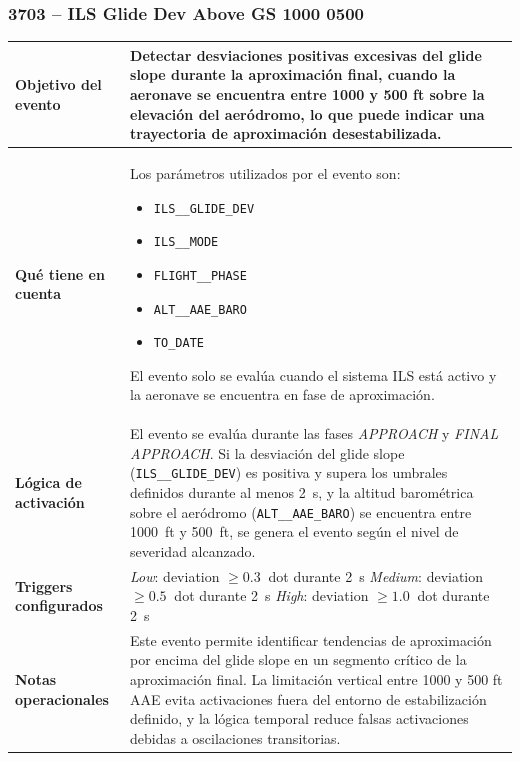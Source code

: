 \documentclass[11pt,a4paper]{article}
\begin{document}
	\subsubsection{3703 -- ILS Glide Dev Above GS 1000 0500}
	
	\begin{longtable}{p{5cm} p{9.5cm}}
		\hline
		\textbf{Objetivo del evento} &
		Detectar desviaciones positivas excesivas del glide slope durante la aproximación final, cuando la aeronave se encuentra entre 1000 y 500 ft sobre la elevación del aeródromo, lo que puede indicar una trayectoria de aproximación desestabilizada. \\
		\hline
		
		\textbf{Qué tiene en cuenta} &
		Los parámetros utilizados por el evento son:
		\begin{itemize}
			\item \texttt{ILS\_\_GLIDE\_DEV}
			\item \texttt{ILS\_\_MODE}
			\item \texttt{FLIGHT\_\_PHASE}
			\item \texttt{ALT\_\_AAE\_BARO}
			\item \texttt{TO\_DATE}
		\end{itemize}
		El evento solo se evalúa cuando el sistema ILS está activo y la aeronave se encuentra en fase de aproximación. \\
		\hline
		
		\textbf{Lógica de activación} &
		El evento se evalúa durante las fases \textit{APPROACH} y \textit{FINAL APPROACH}.  
		Si la desviación del glide slope (\texttt{ILS\_\_GLIDE\_DEV}) es positiva y supera los umbrales definidos durante al menos \SI{2}{s}, y la altitud barométrica sobre el aeródromo (\texttt{ALT\_\_AAE\_BARO}) se encuentra entre \SI{1000}{ft} y \SI{500}{ft}, se genera el evento según el nivel de severidad alcanzado. \\
		\hline
		
		\textbf{Triggers configurados} &
		\textit{Low}: deviation $\geq \SI{0.3}{}$ dot durante \SI{2}{s} \newline
		\textit{Medium}: deviation $\geq \SI{0.5}{}$ dot durante \SI{2}{s} \newline
		\textit{High}: deviation $\geq \SI{1.0}{}$ dot durante \SI{2}{s} \\
		\hline
		
		\textbf{Notas operacionales} &
		Este evento permite identificar tendencias de aproximación por encima del glide slope en un segmento crítico de la aproximación final.  
		La limitación vertical entre 1000 y 500 ft AAE evita activaciones fuera del entorno de estabilización definido, y la lógica temporal reduce falsas activaciones debidas a oscilaciones transitorias. \\
		\hline
	\end{longtable} \newpage
	
\end{document}

